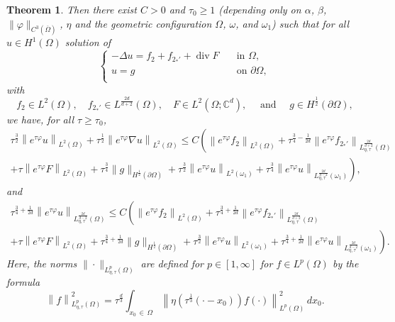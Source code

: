 \documentclass[10pt]{amsart}
\newtheorem{theo}{Theorem}[section]
\theoremstyle{definition}\newtheorem{defi}[theo]{Definition}\newtheorem{rema}[theo]{Remark}\newtheorem{exam}[theo]{Example}\newtheorem{exem}[theo]{Example}\newtheorem{nota}[theo]{Notation}
\newcommand*\C{\mathbb{C}}
\renewcommand{\leq}{\leqslant}
\renewcommand{\geq}{\geqslant}
\renewcommand{\div}{\operatorname{div}}
\begin{document}
\begin{theo}
Then there exist $C>0$ and $\tau_0 \geq 1$ (depending only on $\alpha$, $\beta$, $\| \varphi \|_{C^3(\overline\Omega)}$, $\eta$ and the geometric configuration $\Omega$, $\omega$, and $\omega_1$) such that for all $u \in H^1(\Omega)$ solution of
\begin{equation} \label{Elliptic-Eq-general}
\begin{cases}
- \Delta u = f_2 + f_{2_*'} + \div F \quad &\text{in } \Omega,\\
u=g \quad &\text{on } \partial \Omega,\\
\end{cases}
\end{equation}
with
\begin{equation*}\label{Reg-Source-Terms}
f_2 \in L^2(\Omega),
\quad f_{2_*'} \in L^{ \frac{2d}{d+2}}(\Omega),
\quad F \in L^2(\Omega; \C^{d}),
\quad\text{ and } \quad g \in H^{\frac{1}{2}}(\partial\Omega),
\end{equation*}
we have, for all $\tau \geq \tau_0$,
\begin{multline}\label{Carleman-General-1}
\tau^{\frac{3}{2}} \left\| e^{\tau \varphi} u \right\|_{L^2(\Omega)} +
\tau^{\frac{1}{2}} \left\| e^{\tau \varphi} \nabla u \right\|_{L^2(\Omega)}
\leq C \left(
\left\| e^{\tau \varphi} f_2 \right\|_{L^2(\Omega)} +
\tau^{\frac{3}{4}-\frac{1}{2d}} \left\| e^{\tau \varphi} f_{2_*'} \right\|_{L^{\frac{2d}{d+2}}_{\eta,\tau} (\Omega)}
\right.
\\
\left. +
\tau \left\| e^{\tau \varphi} F \right\|_{L^2(\Omega)} +
\tau^{\frac{3}{4}} \|g \|_{H^{\frac{1}{2}}(\partial \Omega)} +
\tau^{\frac{3}{2}} \left\| e^{\tau \varphi} u\right\|_{L^2(\omega_1)} +
\tau^{\frac{3}{4}} \left\| e^{\tau \varphi} u \right\|_{L^{\frac{2d}{d-2}}_{\eta,\tau} (\omega_1)}
\right),
\end{multline}
and
\begin{multline}\label{Carleman-General-2}
\tau^{\frac{3}{4}+\frac{1}{2d}} \left\| e^{\tau \varphi} u \right\|_{L^{\frac{2d}{d-2}}_{\eta,\tau} (\Omega)}
\leq C \left(
\left\| e^{\tau \varphi} f_2 \right\|_{L^2(\Omega)} +
\tau^{\frac{3}{4}+\frac{1}{2d}} \left\| e^{\tau \varphi} f_{2_*'} \right\|_{L^{\frac{2d}{d+2}}_{\eta,\tau} (\Omega)}
\right.
\\
\left. +
\tau \left\| e^{\tau \varphi} F \right\|_{L^2(\Omega)} +
\tau^{\frac{3}{4}+\frac{1}{2d}} \|g \|_{H^{\frac{1}{2}}(\partial \Omega)} +
\tau^{\frac{3}{2}} \left\| e^{\tau \varphi} u\right\|_{L^2(\omega_1)} +
\tau^{\frac{3}{4}+\frac{1}{2d}} \left\| e^{\tau \varphi} u \right\|_{L^{\frac{2d}{d-2}}_{\eta,\tau} (\omega_1)}
\right).
\end{multline}
Here, the norms $\| \cdot \|_{L^p_{\eta, \tau}(\Omega)}$ are defined for $p \in [1, \infty]$ for $f \in L^p(\Omega)$ by the formula
\begin{equation}\label{Def-L-p-eta-Omega}
\left\| f\right\|_{L^p_{\eta, \tau}(\Omega)}^2 =
\tau^{\frac{d}{3}} \int_{x_0\,\in\,\Omega} \left\| \eta\left(\tau^{\frac{1}{3}} (\cdot -x_0)\right) f(\cdot) \right\|_{L^p(\Omega)}^2 \, dx_0.
\end{equation}
\end{theo}
\end{document}
